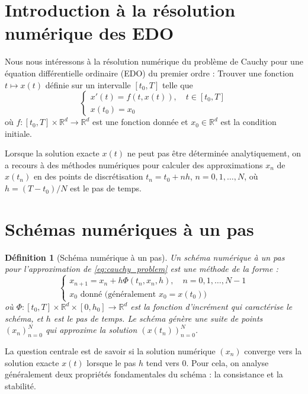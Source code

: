 \documentclass{article}
\newtheorem{definition}{Définition}
\begin{document}
\sloppy

\section{Introduction à la résolution numérique des EDO}

Nous nous intéressons à la résolution numérique du problème de Cauchy pour une équation différentielle ordinaire (EDO) du premier ordre :
Trouver une fonction $t \mapsto x(t)$ définie sur un intervalle $[t_0, T]$ telle que
\begin{equation}
\label{eq:cauchy_problem}
\begin{cases}
x'(t) = f(t, x(t)), \quad t \in [t_0, T] \\
x(t_0) = x_0
\end{cases}
\end{equation}
où $f: [t_0, T] \times \mathbb{R}^d \to \mathbb{R}^d$ est une fonction donnée et $x_0 \in \mathbb{R}^d$ est la condition initiale.

Lorsque la solution exacte $x(t)$ ne peut pas être déterminée analytiquement, on a recours à des méthodes numériques pour calculer des approximations $x_n$ de $x(t_n)$ en des points de discrétisation $t_n = t_0 + n h$, $n = 0, 1, \dots, N$, où $h = (T-t_0)/N$ est le pas de temps.

\section{Schémas numériques à un pas}

\begin{definition}[Schéma numérique à un pas]
Un schéma numérique à un pas pour l'approximation de \eqref{eq:cauchy_problem} est une méthode de la forme :
\begin{equation}
\label{eq:one_step_method}
\tag{P}
\begin{cases}
x_{n+1} = x_n + h \Phi(t_n, x_n, h), \quad n = 0, 1, \dots, N-1 \\
x_0 \text{ donné (généralement } x_0 = x(t_0))
\end{cases}
\end{equation}
où $\Phi: [t_0, T] \times \mathbb{R}^d \times [0, h_0] \to \mathbb{R}^d$ est la fonction d'incrément qui caractérise le schéma, et $h$ est le pas de temps. Le schéma génère une suite de points $(x_n)_{n=0}^N$ qui approxime la solution $(x(t_n))_{n=0}^N$.
\end{definition}

La question centrale est de savoir si la solution numérique $(x_n)$ converge vers la solution exacte $x(t)$ lorsque le pas $h$ tend vers 0. Pour cela, on analyse généralement deux propriétés fondamentales du schéma : la consistance et la stabilité.
\end{document}
